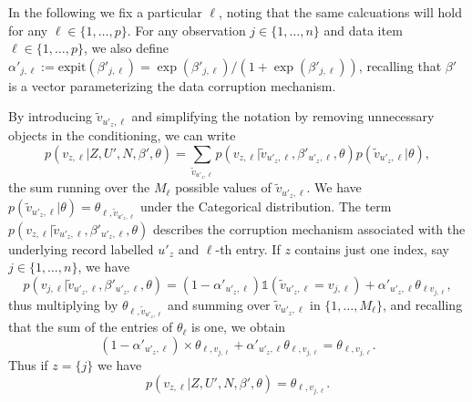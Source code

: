 \documentclass[ba]{imsart}
\begin{document}
In the following we fix a particular $\ell$, noting that the same calcuations will hold for any $\ell \in \{1, \dots, p\}$. 
For any observation $j \in  \{1, \dots, n\}$ and data item $\ell \in \{1, \dots, p\}$, we also 
define ${\alpha'_{j,\ell} := \text{expit}(\beta'_{j,\ell}) = \exp(\beta'_{j,\ell})/(1+\exp(\beta'_{j,\ell}))}$, recalling that $\beta'$ is a vector parameterizing the data corruption mechanism.

By introducing $\tilde{v}_{u'_z,\ell}$ and simplifying the notation by removing unnecessary objects in the conditioning, we can write
\begin{equation}
p(v_{z,\ell}|Z,U',N,\beta',\theta) = \sum_{\tilde{v}_{u'_z,\ell}}     
p(v_{z,\ell}|\tilde{v}_{u'_z,\ell},\beta'_{u'_z,\ell},\theta) p(\tilde{v}_{u'_z,\ell}|\theta),
\end{equation}
the sum running over the $M_\ell$ possible values of $\tilde{v}_{u'_z,\ell}$.
We have $p(\tilde{v}_{u'_z,\ell}|\theta) = \theta_{\ell,\tilde{v}_{u'_z,\ell}}$ under the Categorical distribution.
The term $p(v_{z,\ell}|\tilde{v}_{u'_z,\ell},\beta'_{u'_z,\ell},\theta)$ describes the corruption mechanism associated with the underlying record labelled $u'_z$ and $\ell$-th entry.
If $z$ contains just one index, say $j\in\{1,\ldots,n\}$,
we have 
\[
p(v_{j,\ell}|\tilde{v}_{u'_z,\ell},\beta'_{u'_z,\ell},\theta) = (1-\alpha'_{u'_z,\ell})\mathds{1}(\tilde{v}_{u'_z,\ell} = v_{j,\ell})
+ \alpha'_{u'_z,\ell} \theta_{\ell v_{j,\ell}},
\]
thus multiplying by $\theta_{\ell,\tilde{v}_{u'_z,\ell}}$ and summing over $\tilde{v}_{u'_z,\ell}$ in $\{1,\ldots,M_\ell\}$, and recalling
that the sum of the entries of $\theta_\ell$ is one, we obtain 
\[(1-\alpha'_{u'_z,\ell}) \times \theta_{\ell,v_{j,\ell}}
+ \alpha'_{u'_z,\ell} \theta_{\ell,v_{j,\ell}} = \theta_{\ell,v_{j,\ell}}.\]
Thus if $z = \{j\}$ we have 
\begin{equation}
p(v_{z,\ell}|Z,U',N,\beta',\theta) = \theta_{\ell,v_{j,\ell}}.
\label{eq:case_singleton}
\end{equation}
\end{document}
